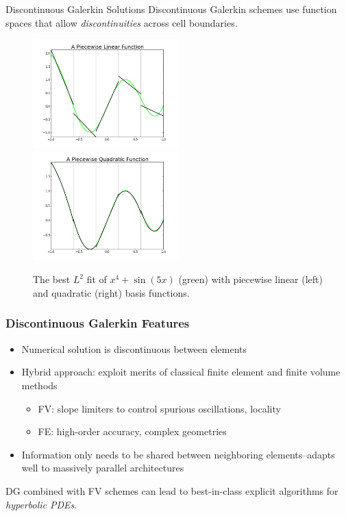 \documentclass[serif,12pt]{beamer}
\begin{document}
\begin{frame}{Discontinuous Galerkin Solutions}
  Discontinuous Galerkin schemes use function spaces that allow
  \emph{discontinuities} across cell boundaries.
  \begin{figure}
    \includegraphics[width=0.5\textwidth]{figures/v1m1.png}
    \includegraphics[width=0.5\textwidth]{figures/v2m1.png}
    \caption{The best $L^2$ fit of $x^4+\sin(5x)$ (green) with piecewise
      linear (left) and quadratic (right) basis functions.}
  \end{figure}
\end{frame}

\begin{frame}
\frametitle{Discontinuous Galerkin Features}
	\begin{itemize}
		\item Numerical solution is discontinuous between elements
		\item Hybrid approach: exploit merits of classical finite element and finite volume methods
		\begin{itemize}
			\item FV: slope limiters to control spurious oscillations, locality
			\item FE: high-order accuracy, complex geometries
		\end{itemize}
		\item Information only needs to be shared between neighboring elements--adapts well to massively parallel architectures
	\end{itemize}
	DG combined with FV schemes can lead to best-in-class explicit
  algorithms for \emph{hyperbolic PDEs}.
\end{frame}
\end{document}
